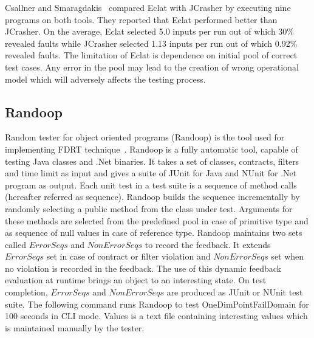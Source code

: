 Csallner and Smaragdakis~\cite{csallner2004jcrasher} compared Eclat with JCrasher by executing nine programs on  both tools. They reported that Eclat performed better than JCrasher. On the average, Eclat selected 5.0 inputs per run out of which 30\% revealed faults while JCrasher selected 1.13 inputs per run out of which 0.92\% revealed faults. The limitation of Eclat is dependence on initial pool of correct test cases. Any error in the pool may lead to the creation of wrong operational model which will adversely affects the testing process.   



\subsection{Randoop}
Random tester for object oriented programs (Randoop) is the tool used for implementing FDRT technique~\cite{pacheco2007randoop}. Randoop is a fully automatic tool, capable of testing Java classes and .Net binaries. It takes a set of classes, contracts, filters and time limit as input and gives a suite of JUnit for Java and NUnit for .Net program as output. Each unit test in a test suite is a sequence of method calls (hereafter referred as sequence). Randoop builds the sequence incrementally by randomly selecting a public method from the class under test.  Arguments for these methods are selected from the predefined pool in case of primitive type and as sequence of null values in case of reference type. Randoop maintains two sets called $ErrorSeqs$ and $NonErrorSeqs$ to record the feedback. It extends $ErrorSeqs$ set in case of contract or filter violation and $NonErrorSeqs$ set when no violation is recorded in the feedback. The use of this dynamic feedback evaluation at runtime brings an object to an interesting state. On test completion, $ErrorSeqs$ and $NonErrorSeqs$ are produced as JUnit or NUnit test suite. The following command runs Randoop to test OneDimPointFailDomain for 100 seconds in CLI mode. Values is a text file containing interesting values which is maintained manually by the tester.
\bigskip

